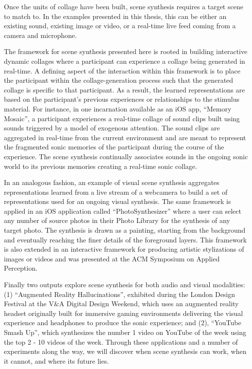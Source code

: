 Once the units of collage have been built, scene synthesis requires a target scene to match to.  In the examples presented in this thesis, this can be either an existing sound, existing image or video, or a real-time live feed coming from a camera and microphone.   



The framework for scene synthesis presented here is rooted in building interactive dynamic collages where a participant can experience a collage being generated in real-time.  A defining aspect of the interaction within this framework is to place the participant within the collage-generation process such that the generated collage is specific to that participant.  As a result, the learned representations are based on the participant's previous experiences or relationships to the stimulus material.  For instance, in one incarnation available as an iOS app, ``Memory Mosaic'', a participant experiences a real-time collage of sound clips built using sounds triggered by a model of exogenous attention.  The sound clips are aggregated in real-time from the current environment and are meant to represent the fragmented sonic memories of the participant during the course of the experience.  The scene synthesis continually associates sounds in the ongoing sonic world to its previous memories creating a real-time sonic collage.  

In an analogous fashion, an example of visual scene synthesis aggregates representations learned from a live stream of a webcamera to build a set of representations used for an ongoing visual synthesis.  The same framework is applied in an iOS application called ``PhotoSynthesizer'' where a user can select any number of source photos in their Photo Library for the synthesis of any target photo.  The synthesis is drawn as a painting, starting from the background and eventually reaching the finer details of the foreground layers.  This framework is also extended in an interactive framework for producing artistic stylizations of images or videos and was presented at the ACM Symposium on Applied Perception.  

Finally two outputs explore scene synthesis for both audio and visual modalities: (1) ``Augmented Reality Hallucinations'', exhibited during the London Design Festival at the V\&A Digital Design Weekend, which uses an augmented reality headset originally built for immersive gaming environments delivering the visual experience and headphones to produce the sonic experience; and (2), ``YouTube Smash Up'', which synthesizes the number 1 video on YouTube of the week using the top 2 - 10 videos of the week.   Through these applications and a number of experiments along the way, we will discover when scene synthesis can work, when it cannot, and where its future lies.

